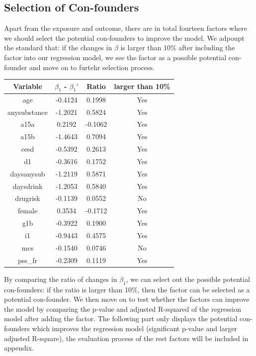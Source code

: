 \documentclass{report}
\begin{document}
\subsection{Selection of Con-founders}
Apart from the exposure and outcome, there are in total fourteen factors where we should select the potential con-founders to improve the model. We adpoupt the standard that: if the changes in $\beta$ is larger than 10\% after including the factor into our regression model, we see the factor as a possible potential con-founder and move on to furtehr selection process.

\begin{center}
 \begin{tabular}{||c c c c||} 
 \hline
 Variable & $\beta_1$ - $\beta_1'$ & Ratio & larger than 10\% \\
 \hline\hline
 age & -0.4124 & 0.1998 & Yes \\ 
 \hline
 anysubstance & -1.2021 & 0.5824 & Yes \\
 \hline
 a15a & 0.2192 & -0.1062 & Yes \\
 \hline
 a15b & -1.4643 & 0.7094 & Yes \\
 \hline
 cesd & -0.5392 & 0.2613 & Yes \\
 \hline
 d1 & -0.3616 & 0.1752 & Yes \\
 \hline
 daysanysub & -1.2119 & 0.5871 & Yes \\
 \hline
 daysdrink & -1.2053 & 0.5840 & Yes \\
 \hline
 drugrisk & -0.1139 & 0.0552 & No \\
 \hline
 female & 0.3534 & -0.1712 & Yes \\
 \hline
 g1b & -0.3922 & 0.1900 & Yes \\
 \hline
 i1 & -0.9443 & 0.4575 & Yes \\
 \hline
 mcs & -0.1540 & 0.0746 & No \\
 \hline
 pss\_fr & -0.2309 & 0.1119 & Yes \\
 \hline
\end{tabular}
\end{center}
By comparing the ratio of changes in $\beta_1$, we can select out the possible potential con-founders: if the ratio is larger than 10\%, then the factor can be selected as a potential con-founder. We then move on to test whether the factors can improve the model by comparing the p-value and adjusted R-squared of the regression model after adding the factor. The following part only displays the potential con-founders which improves the regression model (significant p-value and larger adjusted R-square), the evaluation process of the rest factors will be included in appendix.
\end{document}
